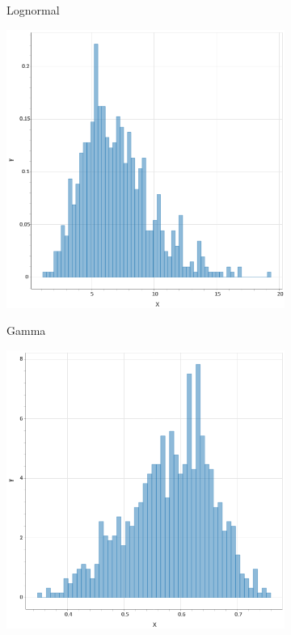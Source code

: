 \begin{figure}
\begin{subfigure}[b]{0.19\textwidth}
        \label{figure: lognorm_hist}
        \caption{Lognormal}
    \end{subfigure}
    \hfill
    \begin{subfigure}[b]{0.19\textwidth}
        \centering
        \includegraphics[width=\textwidth]{figures/body/methodology/gamma_hist.png}
        \label{figure: gamma_hist}
        \caption{Gamma}
    \end{subfigure}
    \hfill
    \begin{subfigure}[b]{0.19\textwidth}
        \centering
        \includegraphics[width=\textwidth]{figures/body/methodology/weibull_hist.png}

\end{subfigure}
\end{figure}
